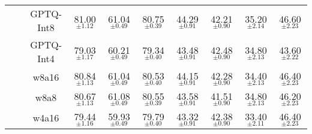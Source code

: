 \begin{table*}
\begin{adjustbox}{width=\textwidth}
\begin{tabulary}{1.4\textwidth}{L CC C CC CC CC}
 &  & GPTQ-Int8 & 81.00$_{\pm1.12}$ & 61.04$_{\pm0.49}$ & 80.75$_{\pm0.39}$ & 44.29$_{\pm0.91}$ & 42.21$_{\pm0.90}$ & 35.20$_{\pm2.14}$ & 46.60$_{\pm2.23}$ \\
 &  & GPTQ-Int4 & 79.03$_{\pm1.17}$ & 60.21$_{\pm0.49}$ & 79.34$_{\pm0.40}$ & 43.48$_{\pm0.91}$ & 42.48$_{\pm0.90}$ & 34.80$_{\pm2.13}$ & 43.60$_{\pm2.22}$ \\
 &  & w8a16 & 80.84$_{\pm1.13}$ & 61.04$_{\pm0.49}$ & 80.53$_{\pm0.40}$ & 44.15$_{\pm0.91}$ & 42.28$_{\pm0.90}$ & 34.40$_{\pm2.13}$ & 46.40$_{\pm2.23}$ \\
 &  & w8a8 & 80.67$_{\pm1.13}$ & 61.08$_{\pm0.49}$ & 80.55$_{\pm0.39}$ & 43.58$_{\pm0.91}$ & 41.51$_{\pm0.90}$ & 34.80$_{\pm2.13}$ & 46.20$_{\pm2.23}$ \\
 &  & w4a16 & 79.44$_{\pm1.16}$ & 59.93$_{\pm0.49}$ & 79.79$_{\pm0.40}$ & 43.32$_{\pm0.91}$ & 42.38$_{\pm0.90}$ & 33.40$_{\pm2.11}$ & 46.40$_{\pm2.23}$ \\


\end{tabulary}
\end{adjustbox}
\end{table*}
